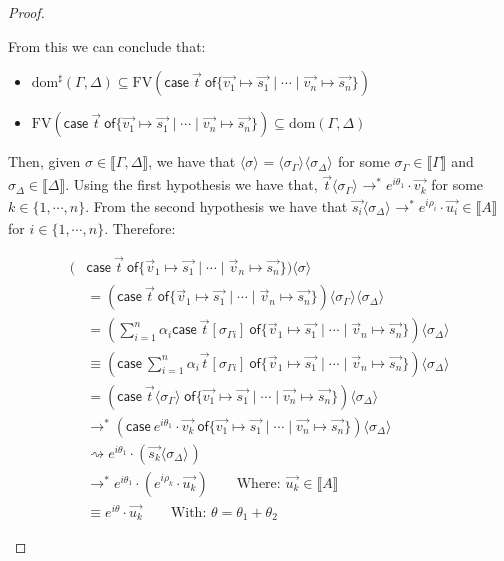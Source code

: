\documentclass[runningheads,orivec,envcountsame,envcountsect]{llncs}
\newcommand\lra{\longrightarrow}
\newcommand\ansubst[2]{\ensuremath{\langle #1 \rangle_{#2}}}
\newcommand\dom[1]{\mathrm{dom}(#1)}
\newcommand\sdom[1]{\mathrm{dom}^{\sharp}(#1)}
\newcommand\FV[1]{\mathrm{FV}(#1)}
\def\gencase#1#2#3#4#5{\ensuremath{\mathsf{case}~#1~\mathsf{of} \{#2\mapsto #4 \mid \dotsb \mid #3\mapsto #5\}}}
\def\lraneq{\rightsquigarrow}
\def\eval{\lra^*}
\def\sem#1{\llbracket#1\rrbracket}
\begin{document}
\begin{proof}
\begin{description}
    From this we can conclude that:
    
    \begin{itemize}
        \item $\sdom{\Gamma,\Delta}\subseteq \FV{\gencase{\vec{t}}{\vec{v_1}}{\vec {v_n}}{\vec{s_1}}{\vec{s_n}}}$
        \item $\FV{\gencase{\vec{t}}{\vec{v_1}}{\vec {v_n}}{\vec{s_1}}{\vec{s_n}}}\subseteq \dom{\Gamma,\Delta}$
    \end{itemize}


    
    Then, given $\sigma\in\sem{\Gamma,\Delta}$, we have that $\ansubst{\sigma}{}=\ansubst{\sigma_\Gamma}{}\ansubst{\sigma_\Delta}{}$ for some $\sigma_\Gamma\in\sem{\Gamma}$ and $\sigma_\Delta\in\sem{\Delta}$. Using the first hypothesis we have that, $\vec{t}\ansubst{\sigma_\Gamma}{}\eval e^{i\theta_1}\cdot\vec{v_k}$ for some $k\in\{1,\dotsb ,n\}$. From the second hypothesis we have that $\vec{s_i}\ansubst{\sigma_\Delta}{}\eval e^{i\rho_i}\cdot\vec{u_i}\in\sem{A}$ for $i\in\{1,\dotsb , n\}$. Therefore:

    \begin{align*}
        (&\gencase{\vec{t}}{\vec v_1}{\vec v_n}{\vec{s_1}}{\vec{s_n}})\ansubst{\sigma}{}\\ 
        &= (\gencase{\vec{t}}{\vec v_1}{\vec v_n}{\vec{s_1}}{\vec{s_n}})\ansubst{\sigma_\Gamma}{}\ansubst{\sigma_\Delta}{}\\
        &= (\sum_{i=1}^{n}\alpha_i \gencase{\vec{t}[\sigma_{\Gamma i}]}{\vec v_1}{\vec v_n}{\vec{s_1}}{\vec{s_n}})\ansubst{\sigma_\Delta}{} \\
        &\equiv (\gencase{\sum_{i=1}^{n} \alpha_i \vec{t}[\sigma_{\Gamma i}]}{\vec v_1}{\vec v_n}{\vec{s_1}}{\vec{s_n}})\ansubst{\sigma_\Delta}{}\\
        &=(\gencase{\vec{t}\ansubst{\sigma_\Gamma}{}}{\vec{v_1}}{\vec{v_n}}{\vec{s_1}}{\vec{s_n}})\ansubst{\sigma_\Delta}{}\\
        &\eval(\gencase{e^{i\theta_1}\cdot\vec{v_k}}{\vec{v_1}}{\vec{v_n}}{\vec{s_1}}{\vec{s_n}})\ansubst{\sigma_\Delta}{}\\
        &\lraneq e^{i\theta_1}\cdot(\vec{s_k}\ansubst{\sigma_\Delta}{})\\
        &\eval e^{i\theta_1}\cdot(e^{i\rho_k}\cdot\vec{u_k})\qquad\text{Where: }\vec{u_k}\in\sem{A}\\
        &\equiv e^{i\theta}\cdot\vec{u_k}\qquad\text{With: }\theta=\theta_1 +\theta_2
    \end{align*}
    

\end{description}
\end{proof}
\end{document}
